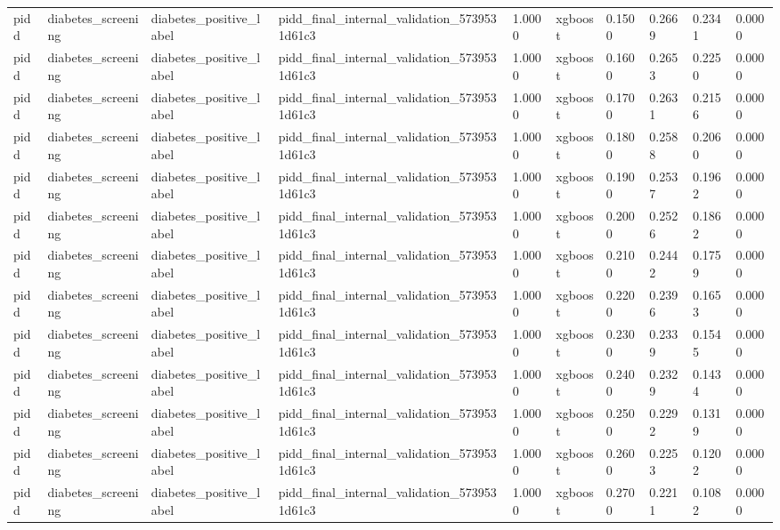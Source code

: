 \begin{tabular}{llllllllll}
pidd & diabetes\_screening & diabetes\_positive\_label & pidd\_final\_internal\_validation\_5739531d61c3 & 1.0000 & xgboost & 0.1500 & 0.2669 & 0.2341 & 0.0000 \\
pidd & diabetes\_screening & diabetes\_positive\_label & pidd\_final\_internal\_validation\_5739531d61c3 & 1.0000 & xgboost & 0.1600 & 0.2653 & 0.2250 & 0.0000 \\
pidd & diabetes\_screening & diabetes\_positive\_label & pidd\_final\_internal\_validation\_5739531d61c3 & 1.0000 & xgboost & 0.1700 & 0.2631 & 0.2156 & 0.0000 \\
pidd & diabetes\_screening & diabetes\_positive\_label & pidd\_final\_internal\_validation\_5739531d61c3 & 1.0000 & xgboost & 0.1800 & 0.2588 & 0.2060 & 0.0000 \\
pidd & diabetes\_screening & diabetes\_positive\_label & pidd\_final\_internal\_validation\_5739531d61c3 & 1.0000 & xgboost & 0.1900 & 0.2537 & 0.1962 & 0.0000 \\
pidd & diabetes\_screening & diabetes\_positive\_label & pidd\_final\_internal\_validation\_5739531d61c3 & 1.0000 & xgboost & 0.2000 & 0.2526 & 0.1862 & 0.0000 \\
pidd & diabetes\_screening & diabetes\_positive\_label & pidd\_final\_internal\_validation\_5739531d61c3 & 1.0000 & xgboost & 0.2100 & 0.2442 & 0.1759 & 0.0000 \\
pidd & diabetes\_screening & diabetes\_positive\_label & pidd\_final\_internal\_validation\_5739531d61c3 & 1.0000 & xgboost & 0.2200 & 0.2396 & 0.1653 & 0.0000 \\
pidd & diabetes\_screening & diabetes\_positive\_label & pidd\_final\_internal\_validation\_5739531d61c3 & 1.0000 & xgboost & 0.2300 & 0.2339 & 0.1545 & 0.0000 \\
pidd & diabetes\_screening & diabetes\_positive\_label & pidd\_final\_internal\_validation\_5739531d61c3 & 1.0000 & xgboost & 0.2400 & 0.2329 & 0.1434 & 0.0000 \\
pidd & diabetes\_screening & diabetes\_positive\_label & pidd\_final\_internal\_validation\_5739531d61c3 & 1.0000 & xgboost & 0.2500 & 0.2292 & 0.1319 & 0.0000 \\
pidd & diabetes\_screening & diabetes\_positive\_label & pidd\_final\_internal\_validation\_5739531d61c3 & 1.0000 & xgboost & 0.2600 & 0.2253 & 0.1202 & 0.0000 \\
pidd & diabetes\_screening & diabetes\_positive\_label & pidd\_final\_internal\_validation\_5739531d61c3 & 1.0000 & xgboost & 0.2700 & 0.2211 & 0.1082 & 0.0000 \\

\end{tabular}
